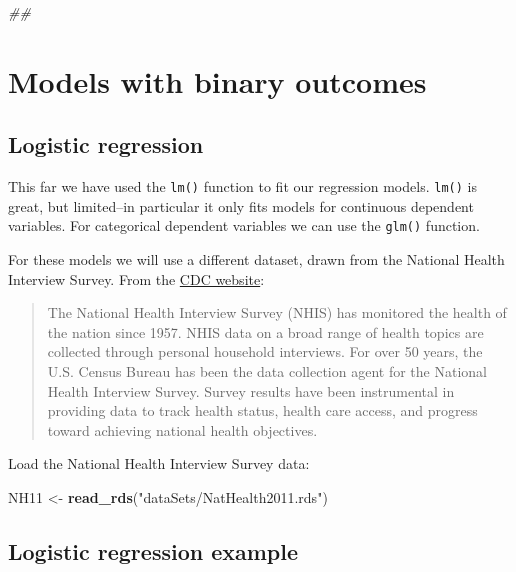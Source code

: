 \documentclass[
]{book}
\newenvironment{Shaded}{\begin{snugshade}}{\end{snugshade}}
\newcommand{\CommentTok}[1]{\textcolor[rgb]{0.56,0.35,0.01}{\textit{#1}}}
\newcommand{\KeywordTok}[1]{\textcolor[rgb]{0.13,0.29,0.53}{\textbf{#1}}}
\newcommand{\NormalTok}[1]{#1}
\newcommand{\StringTok}[1]{\textcolor[rgb]{0.31,0.60,0.02}{#1}}
\begin{document}
\begin{Shaded}
\begin{Highlighting}[]
\CommentTok{## }
\end{Highlighting}
\end{Shaded}

\hypertarget{models-with-binary-outcomes}{%
\section{Models with binary outcomes}\label{models-with-binary-outcomes}}

\hypertarget{logistic-regression}{%
\subsection{Logistic regression}\label{logistic-regression}}

This far we have used the \texttt{lm()} function to fit our regression models. \texttt{lm()} is great, but limited--in particular it only fits models for continuous dependent variables. For categorical dependent variables we can use the \texttt{glm()} function.

For these models we will use a different dataset, drawn from the National Health Interview Survey. From the \href{http://www.cdc.gov/nchs/nhis.htm}{CDC website}:

\begin{quote}
The National Health Interview Survey (NHIS) has monitored the health of the nation since 1957. NHIS data on a broad range of health topics are collected through personal household interviews. For over 50 years, the U.S. Census Bureau has been the data collection agent for the National Health Interview Survey. Survey results have been instrumental in providing data to track health status, health care access, and progress toward achieving national health objectives.
\end{quote}

Load the National Health Interview Survey data:

\begin{Shaded}
\begin{Highlighting}[]
\NormalTok{  NH11 <-}\StringTok{ }\KeywordTok{read_rds}\NormalTok{(}\StringTok{"dataSets/NatHealth2011.rds"}\NormalTok{)}
\end{Highlighting}
\end{Shaded}

\hypertarget{logistic-regression-example}{%
\subsection{Logistic regression example}\label{logistic-regression-example}}
\end{document}

